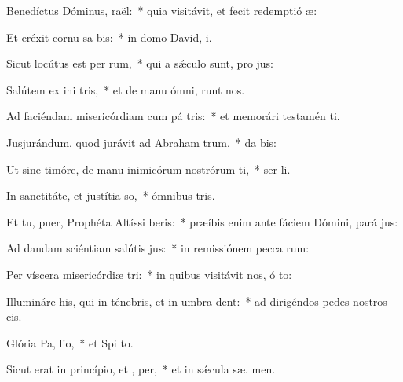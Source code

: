 \item Benedíctus Dóminus,  raël:~* quia visitávit, et fecit redemptió  æ:
\item Et eréxit cornu sa bis:~* in domo David,  i.
\item Sicut locútus est per  rum,~* qui a sǽculo sunt, pro jus:
\item Salútem ex ini tris,~* et de manu ómni,  runt nos.
\item Ad faciéndam misericórdiam cum pá tris:~* et memorári testamén  ti.
\item Jusjurándum, quod jurávit ad Abraham  trum,~* da  bis:
\item Ut sine timóre, de manu inimicórum nostrórum ti,~* ser li.
\item In sanctitáte, et justítia  so,~* ómnibus  tris.
\item Et tu, puer, Prophéta Altíssi beris:~* præíbis enim ante fáciem Dómini, pará  jus:
\item Ad dandam sciéntiam salútis  jus:~* in remissiónem pecca rum:
\item Per víscera misericórdiæ  tri:~* in quibus visitávit nos, ó  to:
\item Illumináre his, qui in ténebris, et in umbra  dent:~* ad dirigéndos pedes nostros   cis.
\item Glória Pa,  lio,~* et Spi to.
\item Sicut erat in princípio, et ,  per,~* et in sǽcula sæ. men.
